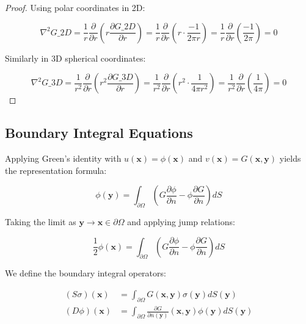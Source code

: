 \documentclass[12pt]{article}
\theoremstyle{definition}
\begin{document}
\begin{proof}
Using polar coordinates in 2D:

\begin{equation}
\nabla^2 G\_2D = \frac{1}{r} \frac{\partial}{\partial r} \left(r \frac{\partial G\_2D}{\partial r}\right) = \frac{1}{r} \frac{\partial}{\partial r} \left(r \cdot \frac{-1}{2\pi r}\right) = \frac{1}{r} \frac{\partial}{\partial r} \left(\frac{-1}{2\pi}\right) = 0
\end{equation}

Similarly in 3D spherical coordinates:

\begin{equation}
\nabla^2 G\_3D = \frac{1}{r^2} \frac{\partial}{\partial r} \left(r^2 \frac{\partial G\_3D}{\partial r}\right) = \frac{1}{r^2} \frac{\partial}{\partial r} \left(r^2 \cdot \frac{1}{4\pi r^2}\right) = \frac{1}{r^2} \frac{\partial}{\partial r} \left(\frac{1}{4\pi}\right) = 0
\end{equation}

\end{proof}

\subsection{Boundary Integral Equations}

Applying Green's identity with $u(\mathbf{x}) = \phi(\mathbf{x})$ and $v(\mathbf{x}) = G(\mathbf{x}, \mathbf{y})$ yields the representation formula:

\begin{equation}
\phi(\mathbf{y}) = \int_{\partial \Omega} \left(G \frac{\partial \phi}{\partial n} - \phi \frac{\partial G}{\partial n}\right) dS
\end{equation}

Taking the limit as $\mathbf{y} \to \mathbf{x} \in \partial \Omega$ and applying jump relations:

\begin{equation}
\frac{1}{2} \phi(\mathbf{x}) = \int_{\partial \Omega} \left(G \frac{\partial \phi}{\partial n} - \phi \frac{\partial G}{\partial n}\right) dS
\end{equation}

We define the boundary integral operators:

\begin{align}
(S \sigma)(\mathbf{x}) &= \int_{\partial \Omega} G(\mathbf{x}, \mathbf{y}) \sigma(\mathbf{y}) dS(\mathbf{y}) \\
(D \phi)(\mathbf{x}) &= \int_{\partial \Omega} \frac{\partial G}{\partial n(\mathbf{y})}(\mathbf{x}, \mathbf{y}) \phi(\mathbf{y}) dS(\mathbf{y})
\end{align}
\end{document}
